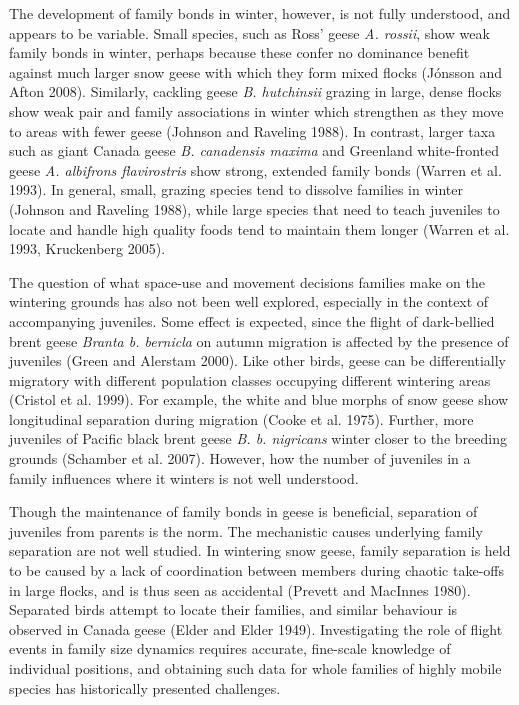 \documentclass[10pt,twocolumn]{paper}
\begin{document}
The development of family bonds in winter, however, is not fully
understood, and appears to be variable. Small species, such as Ross'
geese \emph{A. rossii}, show weak family bonds in winter, perhaps
because these confer no dominance benefit against much larger snow geese
with which they form mixed flocks (Jónsson and Afton 2008). Similarly,
cackling geese \emph{B. hutchinsii} grazing in large, dense flocks show
weak pair and family associations in winter which strengthen as they
move to areas with fewer geese (Johnson and Raveling 1988). In contrast,
larger taxa such as giant Canada geese \emph{B. canadensis maxima} and
Greenland white-fronted geese \emph{A. albifrons flavirostris} show
strong, extended family bonds (Warren et al. 1993). In general, small,
grazing species tend to dissolve families in winter (Johnson and
Raveling 1988), while large species that need to teach juveniles to
locate and handle high quality foods tend to maintain them longer
(Warren et al. 1993, Kruckenberg 2005).

The question of what space-use and movement decisions families make on
the wintering grounds has also not been well explored, especially in the
context of accompanying juveniles. Some effect is expected, since the
flight of dark-bellied brent geese \emph{Branta b. bernicla} on autumn
migration is affected by the presence of juveniles (Green and Alerstam
2000). Like other birds, geese can be differentially migratory with
different population classes occupying different wintering areas
(Cristol et al. 1999). For example, the white and blue morphs of snow
geese show longitudinal separation during migration (Cooke et al. 1975).
Further, more juveniles of Pacific black brent geese \emph{B. b.
nigricans} winter closer to the breeding grounds (Schamber et al. 2007).
However, how the number of juveniles in a family influences where it
winters is not well understood.

Though the maintenance of family bonds in geese is beneficial,
separation of juveniles from parents is the norm. The mechanistic causes
underlying family separation are not well studied. In wintering snow
geese, family separation is held to be caused by a lack of coordination
between members during chaotic take-offs in large flocks, and is thus
seen as accidental (Prevett and MacInnes 1980). Separated birds attempt
to locate their families, and similar behaviour is observed in Canada
geese (Elder and Elder 1949). Investigating the role of flight events in
family size dynamics requires accurate, fine-scale knowledge of
individual positions, and obtaining such data for whole families of
highly mobile species has historically presented challenges.
\end{document}
